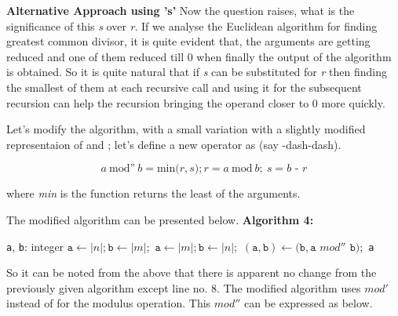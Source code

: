 \documentclass[conference,compsoc]{IEEEtran}
\newcommand{\var}[1]{\textit{#1}}
\newcommand{\progvar}[1]{\texttt{#1}}
\renewcommand{\mod}{\text{mod}}
\newcommand{\moddash}{\text{mod'}}
\newcommand{\moddashdash}{\text{mod''}}
\begin{document}
\textbf{Alternative Approach using 's'}
Now the question raises, what is the significance of this \var{s} over \var{r}.
If we analyse the Euclidean algorithm for finding greatest common divisor, it is quite evident that, the arguments are getting reduced and one of them reduced till 0 when finally the output of the algorithm is obtained. So it is quite natural that if \var{s} can be substituted  for \var{r} then finding the smallest of them at each recursive call and using it for the subsequent recursion can help the recursion bringing the operand closer to 0 more quickly.

Let's modify the algorithm, with a small variation with a slightly modified representaion of \mod and \moddash; let's define a new operator as \moddashdash(say \mod -dash-dash).

\begin{equation} \label{eq:gcd_modulus_1_2}
\var{a} \> \moddashdash  \> \var{b} = \text{min} \var(r, s);
\var{r} = \var{a} \> \mod \> \var{b}; \> \var{s} = \var{b - r}
\end{equation}

where \textit{min} is the function returns the least of the arguments.

The modified algorithm can be presented below.
\newline \textbf{Algorithm 4:}
\begin{algorithmic}[1]
\STATE \progvar{a}, \progvar{b}: integer
	\STATE $\progvar{a} \gets |n|; \progvar{b} \gets |m|;$
\ELSE
	\STATE $\progvar{a} \gets |m|; \progvar{b} \gets |n|;$
\ENDIF
\WHILE{$\progvar{b} > 0$ } 
	\STATE $(\progvar{a}, \progvar{b}) \leftarrow (\progvar{b}, \progvar{a}  $ $mod'' $ $\progvar{b});$
\ENDWHILE
\RETURN \progvar{a}
\end {algorithmic}

So it can be noted from the above that there is apparent no change from the previously given algorithm except line no. 8. The modified algorithm uses $mod'$ instead of \mod for the modulus operation. This $mod''$ can be expressed as below.
\end{document}
